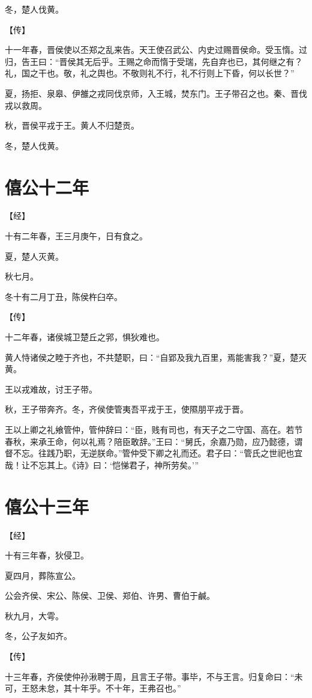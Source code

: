 \documentclass[a4paper,12pt,UTF8,twoside]{ctexbook}
\begin{document}
冬，楚人伐黄。

【传】

十一年春，晋侯使以丕郑之乱来告。天王使召武公、内史过赐晋侯命。受玉惰。过归，告王曰：“晋侯其无后乎。王赐之命而惰于受瑞，先自弃也已，其何继之有？礼，国之干也。敬，礼之舆也。不敬则礼不行，礼不行则上下昏，何以长世？”

夏，扬拒、泉皋、伊雒之戎同伐京师，入王城，焚东门。王子带召之也。秦、晋伐戎以救周。

秋，晋侯平戎于王。黄人不归楚贡。

冬，楚人伐黄。


\chapter{僖公十二年}



【经】

十有二年春，王三月庚午，日有食之。

夏，楚人灭黄。

秋七月。

冬十有二月丁丑，陈侯杵臼卒。

【传】

十二年春，诸侯城卫楚丘之郛，惧狄难也。

黄人恃诸侯之睦于齐也，不共楚职，曰：“自郢及我九百里，焉能害我？”夏，楚灭黄。

王以戎难故，讨王子带。

秋，王子带奔齐。冬，齐侯使管夷吾平戎于王，使隰朋平戎于晋。

王以上卿之礼飨管仲，管仲辞曰：“臣，贱有司也，有天子之二守国、高在。若节春秋，来承王命，何以礼焉？陪臣敢辞。”王曰：“舅氏，余嘉乃勋，应乃懿德，谓督不忘。往践乃职，无逆朕命。”管仲受下卿之礼而还。君子曰：“管氏之世祀也宜哉！让不忘其上。《诗》曰：‘恺悌君子，神所劳矣。’”

\chapter{僖公十三年}


【经】

十有三年春，狄侵卫。

夏四月，葬陈宣公。

公会齐侯、宋公、陈侯、卫侯、郑伯、许男、曹伯于鹹。

秋九月，大雩。

冬，公子友如齐。

【传】

十三年春，齐侯使仲孙湫聘于周，且言王子带。事毕，不与王言。归复命曰：“未可，王怒未怠，其十年乎。不十年，王弗召也。”
\end{document}

